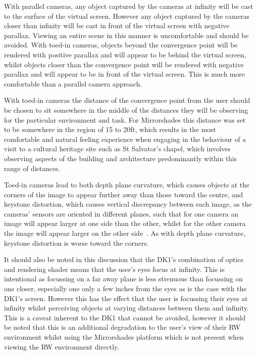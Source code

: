 With parallel cameras, any object captured by the cameras at infinity will be cast to the surface of the virtual screen. However any object captured by the cameras closer than infinity will be cast in front of the virtual screen with negative parallax. Viewing an entire scene in this manner is uncomfortable and should be avoided. With toed-in cameras, objects beyond the convergence point will be rendered with positive parallax and will appear to be behind the virtual screen, whilst objects closer than the convergence point will be rendered with negative parallax and will appear to be in front of the virtual screen. This is much more comfortable than a parallel camera approach.

With toed-in cameras the distance of the convergence point from the user should be chosen to sit somewhere in the middle of the distances they will be observing for the particular environment and task. For Mirrorshades this distance was set to be somewhere in the region of 15 to 20ft, which results in the most comfortable and natural feeling experience when engaging in the behaviour of a visit to a cultural heritage site such as St Salvator's chapel, which involves observing aspects of the building and architecture predominantly within this range of distances.

Toed-in cameras lead to both depth plane curvature, which causes objects at the corners of the image to appear further away than those toward the centre, and keystone distortion, which causes vertical discrepancy between each image, as the cameras' sensors are oriented in different planes, such that for one camera an image will appear larger at one side than the other, whilst for the other camera the image will appear larger on the other side~\cite{Woods1993}. As with depth plane curvature, keystone distortion is worse toward the corners.

It should also be noted in this discussion that the DK1's combination of optics and rendering shader means that the user's eyes focus at infinity. This is intentional as focussing on a far away plane is less strenuous than focussing on one closer, especially one only a few inches from the eyes as is the case with the DK1's screen. However this has the effect that the user is focussing their eyes at infinity whilst perceiving objects at varying distances between them and infinity. This is a caveat inherent to the DK1 that cannot be avoided, however it should be noted that this is an additional degradation to the user's view of their RW environment whilst using the Mirrorshades platform which is not present when viewing the RW environment directly.

